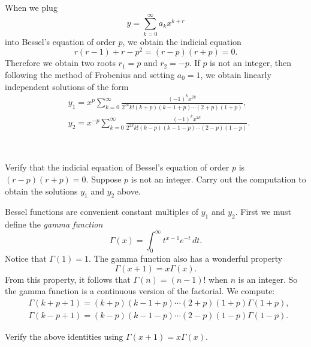 When we plug
\begin{equation*}
y = \sum_{k=0}^\infty a_k x^{k+r}
\end{equation*}
into Bessel's equation of order $p$, we obtain the indicial equation
\begin{equation*}
r(r-1)+r-p^2 = (r-p)(r+p) = 0 .
\end{equation*}
Therefore we obtain two roots $r_1 = p$ and $r_2 = -p$.
If $p$ is not an integer, then following the method of Frobenius and
setting $a_0 = 1$, we obtain
linearly independent solutions of the form
\begin{align*}
& y_1 = x^p \sum_{k=0}^\infty
\frac{{(-1)}^k x^{2k}}{2^{2k} k! (k+p)(k-1+p)\cdots (2+p)(1+p)} ,
\\
& y_2 = x^{-p} \sum_{k=0}^\infty
\frac{{(-1)}^k x^{2k}}{2^{2k} k! (k-p)(k-1-p)\cdots (2-p)(1-p)} .
\end{align*}

\begin{exercise}
{\ }
\begin{tasks}
\task
Verify that the indicial equation of Bessel's equation of order $p$ is
$(r-p)(r+p)=0$.
\task
Suppose $p$ is not an integer.  Carry out the computation
to obtain the solutions $y_1$ and $y_2$ above.
\end{tasks}
\end{exercise}

Bessel functions are convenient constant multiples of $y_1$ and $y_2$.
First we must define the \emph{gamma function}
\begin{equation*}
\Gamma(x) = \int_0^\infty t^{x-1} e^{-t} \, dt .
\end{equation*}
Notice that $\Gamma(1) = 1$.
The gamma function also has a wonderful property
\begin{equation*}
\Gamma(x+1) = x \Gamma(x) .
\end{equation*}
From this property, it follows that $\Gamma(n) = (n-1)!$ when $n$ is an
integer.  So the gamma function is a continuous version of the factorial.  We
compute:
\begin{align*}
& \Gamma(k+p+1)=(k+p)(k-1+p)\cdots (2+p)(1+p) \Gamma(1+p) ,
\\
& \Gamma(k-p+1)=(k-p)(k-1-p)\cdots (2-p)(1-p) \Gamma(1-p) .
\end{align*}

\begin{exercise}
Verify the above identities using 
$\Gamma(x+1) = x \Gamma(x)$.
\end{exercise}

